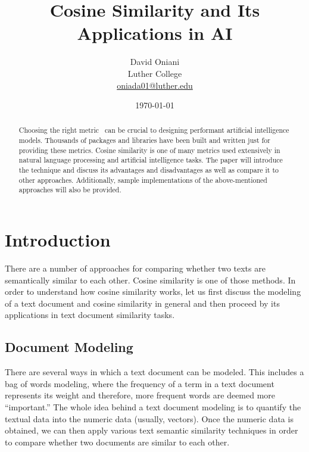 \documentclass[11pt]{article}
\author{David Oniani\\
        Luther College\\
        \href{mailto:oniada01@luther.edu}{oniada01@luther.edu}}
\title{\textbf{Cosine Similarity and Its Applications in AI}}
\date{\today}
\begin{document}
\maketitle


\begin{abstract}
  \noindent Choosing the right metric~\cite{thomas2020} can be crucial to
  designing performant artificial intelligence models. Thousands of packages
  and libraries have been built and written just for providing these metrics.
  Cosine similarity is one of many metrics used extensively in natural language
  processing and artificial intelligence tasks. The paper will introduce the
  technique and discuss its advantages and disadvantages as well as compare it
  to other approaches. Additionally, sample implementations of the
  above-mentioned approaches will also be provided.
\end{abstract}


\newpage
\tableofcontents
\newpage


\section{Introduction}

There are a number of approaches for comparing whether two texts are
semantically similar to each other. Cosine similarity is one of those methods.
In order to understand how cosine similarity works, let us first discuss the
modeling of a text document and cosine similarity in general and then proceed
by its applications in text document similarity tasks.

\subsection{Document Modeling}

There are several ways in which a text document can be modeled. This includes a
bag of words modeling, where the frequency of a term in a text document
represents its weight and therefore, more frequent words are deemed more
``important.'' The whole idea behind a text document modeling is to quantify
the textual data into the numeric data (usually, vectors). Once the numeric
data is obtained, we can then apply various text semantic similarity techniques
in order to compare whether two documents are similar to each other.
\end{document}
